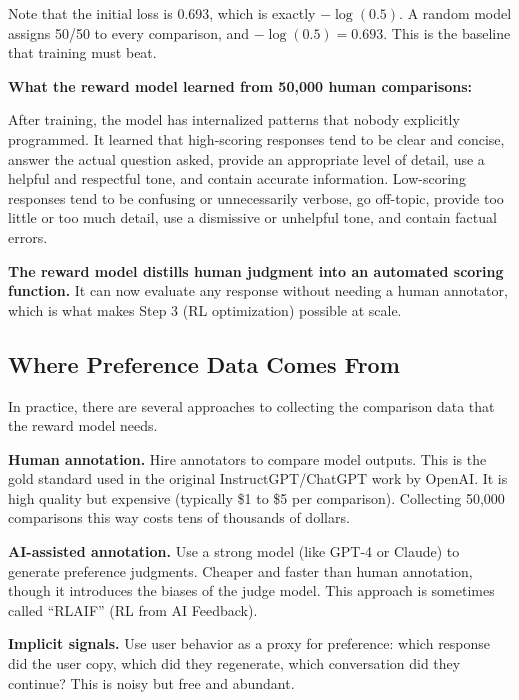 \begin{chapterenv}
\begin{tipbox}
Note that the initial loss is 0.693, which is exactly $-\log(0.5)$. A random model assigns 50/50 to every comparison, and $-\log(0.5) = 0.693$. This is the baseline that training must beat.
\end{tipbox}

\begin{infobox}
\textbf{What the reward model learned from 50,000 human comparisons:}

After training, the model has internalized patterns that nobody explicitly programmed. It learned that high-scoring responses tend to be clear and concise, answer the actual question asked, provide an appropriate level of detail, use a helpful and respectful tone, and contain accurate information. Low-scoring responses tend to be confusing or unnecessarily verbose, go off-topic, provide too little or too much detail, use a dismissive or unhelpful tone, and contain factual errors.

\textbf{The reward model distills human judgment into an automated scoring function.} It can now evaluate any response without needing a human annotator, which is what makes Step 3 (RL optimization) possible at scale.
\end{infobox}

\subsection{Where Preference Data Comes From}

In practice, there are several approaches to collecting the comparison data that the reward model needs.

\textbf{Human annotation.} Hire annotators to compare model outputs. This is the gold standard used in the original InstructGPT/ChatGPT work by OpenAI. It is high quality but expensive (typically \$1 to \$5 per comparison). Collecting 50,000 comparisons this way costs tens of thousands of dollars.

\textbf{AI-assisted annotation.} Use a strong model (like GPT-4 or Claude) to generate preference judgments. Cheaper and faster than human annotation, though it introduces the biases of the judge model. This approach is sometimes called ``RLAIF'' (RL from AI Feedback).

\textbf{Implicit signals.} Use user behavior as a proxy for preference: which response did the user copy, which did they regenerate, which conversation did they continue? This is noisy but free and abundant.


\end{chapterenv}
